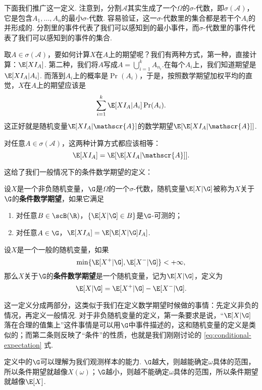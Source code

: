 下面我们推广这一定义. 注意到，分割$\mathscr{A}$其实生成了一个$\Omega$的$\sigma$-代数，即$\sigma(\mathscr{A})$，它是包含$A_1,\dots,A_n$的最小$\sigma$-代数. 容易验证，这一$\sigma$-代数里的集合都是若干个$A_i$的并形成的. 分割里的事件代表了我们可以感知到的最小事件，而$\sigma$-代数里的事件代表了我们可以感知到的事件的集合. 

取$A\in\sigma(\mathscr{A})$，要如何计算$X$在$A$上的期望呢？我们有两种方式，第一种，直接计算：$\E[XI_A]$. 第二种，我们将$A$写成$A=\bigcup_{i=1}^k A_{n_i}$.在每个$A_i$上，我们知道期望是$\E[XI_A|A_i]$. 而落到$A_i$上的概率是$\Pr(A_i)$，于是，按照数学期望加权平均的直觉，$X$在$A$上的期望应该是
\[\sum_{i=1}^k \E[XI_A|A_i]\Pr(A_i).\]
这正好就是随机变量$\E[XI_A|\mathscr{A}]$的数学期望$\E[\E[XI_A|\mathscr{A}]]$.

对任意$A\in\sigma(\mathscr{A})$，这两种计算方式都应该相等：
\begin{equation}
    \E[XI_A]=\E[\E[XI_A|\mathscr{A}]].\label{eq:conditional-expectation}
\end{equation}

这给了我们一般情况下的条件数学期望的定义：

\begin{definition}\label{def:conditional-expectation-2}
设$X$是一个非负随机变量，$\G$是$\Omega$的一个$\sigma$-代数，随机变量$\E[X|\G]$被称为$X$关于$\G$的\textbf{条件数学期望}，如果它满足
\begin{enumerate}
    \item 对任意$B\in\scB(\R)$，$\{\E[X|\G]\in B\}$是$\G$-可测的；
    \item 对任意$A\in\G$，$\E[XI_A]=\E[\E[X|\G]I_A]$.
\end{enumerate}

设$X$是一个一般的随机变量，如果
\[\min\{\E[X^+|\G],\E[X^-|\G]\}<+\infty,\]
那么$X$关于$\G$的\textbf{条件数学期望}是一个随机变量，记为$\E[X|\G]$，定义为
\[\E[X|\G]=\E[X^+|\G]-\E[X^-|\G].\]
\end{definition}

这一定义分成两部分，这类似于我们在定义数学期望时候做的事情：先定义非负的情况，再定义一般情况. 对于非负随机变量的定义，第一条要求是说，“$\E[X|\G]$落在合理的值集上”这件事情是可以用$\G$中事件描述的，这和随机变量的定义是类似的；而第二条则反映了“条件”的性质，也就是我们刚刚讨论的 \eqref{eq:conditional-expectation} 式. 

定义中的$\G$可以理解为我们观测样本的能力. $\G$越大，则越能确定$\omega$具体的范围，所以条件期望就越像$X(\omega)$；$\G$越小，则越不能确定$\omega$具体的范围，所以条件期望就越像$\E[X]$.

